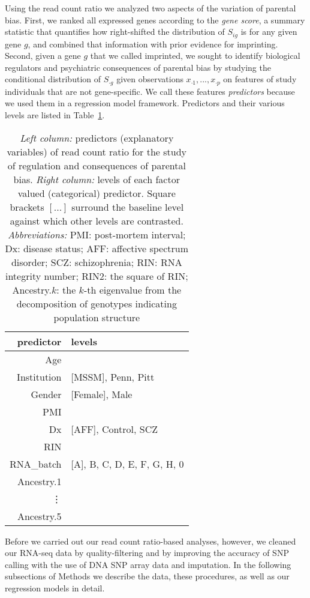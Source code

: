 \documentclass[letterpaper]{article}
\begin{document}
Using the read count ratio we analyzed two aspects of the variation of
parental bias.  First, we ranked all expressed genes according to the
\emph{gene score}, a summary statistic that quantifies how right-shifted the
distribution of \(S_{ig}\) is for any given gene \(g\), and combined that
information with prior evidence for imprinting.  Second, given a gene \(g\)
that we called imprinted, we sought to identify biological regulators and
psychiatric consequences of parental bias by studying the conditional
distribution of \(S_{\cdot g}\) given observations \(x_{\cdot 1},...,x_{\cdot
p}\) on features of study individuals that are not gene-specific. We call
these features \emph{predictors} because we used them in a regression model
framework.  Predictors and their various levels are listed in
Table~\ref{tab:predictors}.

\begin{table}
\begin{center}
\begin{tabular}{r|l}
predictor & levels\\
\hline
Age &  \\
Institution & [MSSM], Penn, Pitt\\
Gender & [Female], Male\\
PMI & \\
Dx & [AFF], Control, SCZ\\
RIN &  \\
RNA\_batch & [A], B, C, D, E, F, G, H, 0\\
Ancestry.1 & \\
\vdots & \\
Ancestry.5 &  \\
\end{tabular}
\caption{ \emph{Left column:} predictors (explanatory variables) of read count ratio for the study of
regulation and consequences of parental bias.  \emph{Right column:} levels of
each factor valued (categorical) predictor.  Square brackets \([...]\) surround the baseline
level against which other levels are contrasted.  \emph{Abbreviations:} PMI: post-mortem interval; Dx:
disease status; AFF: affective spectrum disorder; SCZ: schizophrenia; RIN: RNA
integrity number; RIN2: the square of RIN; Ancestry.\(k\): the \(k\)-th
eigenvalue from the decomposition of genotypes indicating population structure}
\label{tab:predictors}
\end{center}
\end{table}

Before we carried out our read count ratio-based analyses, however, we cleaned
our RNA-seq data by quality-filtering and by improving the accuracy of SNP
calling with the use of DNA SNP array data and imputation. In the following
subsections of Methods we describe the data, these procedures, as well as our
regression models in detail.
\end{document}
